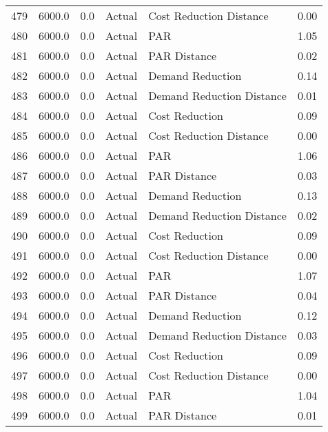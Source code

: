 \begin{longtable}{lrrllr}
479  &       6000.0 &     0.0 &         Actual &    Cost Reduction Distance &   0.00 \\
480  &       6000.0 &     0.0 &         Actual &                        PAR &   1.05 \\
481  &       6000.0 &     0.0 &         Actual &               PAR Distance &   0.02 \\
482  &       6000.0 &     0.0 &         Actual &           Demand Reduction &   0.14 \\
483  &       6000.0 &     0.0 &         Actual &  Demand Reduction Distance &   0.01 \\
484  &       6000.0 &     0.0 &         Actual &             Cost Reduction &   0.09 \\
485  &       6000.0 &     0.0 &         Actual &    Cost Reduction Distance &   0.00 \\
486  &       6000.0 &     0.0 &         Actual &                        PAR &   1.06 \\
487  &       6000.0 &     0.0 &         Actual &               PAR Distance &   0.03 \\
488  &       6000.0 &     0.0 &         Actual &           Demand Reduction &   0.13 \\
489  &       6000.0 &     0.0 &         Actual &  Demand Reduction Distance &   0.02 \\
490  &       6000.0 &     0.0 &         Actual &             Cost Reduction &   0.09 \\
491  &       6000.0 &     0.0 &         Actual &    Cost Reduction Distance &   0.00 \\
492  &       6000.0 &     0.0 &         Actual &                        PAR &   1.07 \\
493  &       6000.0 &     0.0 &         Actual &               PAR Distance &   0.04 \\
494  &       6000.0 &     0.0 &         Actual &           Demand Reduction &   0.12 \\
495  &       6000.0 &     0.0 &         Actual &  Demand Reduction Distance &   0.03 \\
496  &       6000.0 &     0.0 &         Actual &             Cost Reduction &   0.09 \\
497  &       6000.0 &     0.0 &         Actual &    Cost Reduction Distance &   0.00 \\
498  &       6000.0 &     0.0 &         Actual &                        PAR &   1.04 \\
499  &       6000.0 &     0.0 &         Actual &               PAR Distance &   0.01 \\

\end{longtable}
